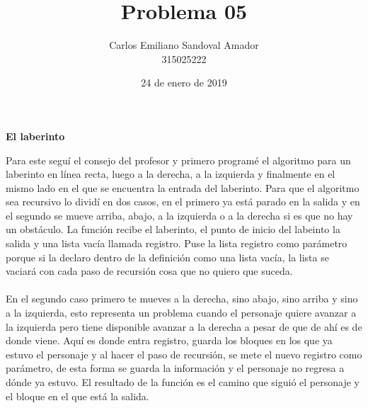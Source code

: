 \documentclass[letterpaper, 12pt, oneside]{article}%
\title{Problema 05}
\author{Carlos Emiliano Sandoval Amador \\ 315025222}
\date{24 de enero de 2019}
\begin{document}
	\maketitle
	\begin{center}
		\textbf{\large El laberinto}
	\end{center}
	Para este seguí el consejo del profesor y primero programé el algoritmo para un laberinto en línea recta, luego a la derecha, a la izquierda y finalmente en el mismo lado en el que se encuentra la entrada del laberinto. Para que el algoritmo sea recursivo lo dividí en dos casos, en el primero ya está parado en la salida y en el segundo se mueve arriba, abajo, a la izquierda o a la derecha si es que no hay un obstáculo. La función recibe el laberinto, el punto de inicio del labeinto la salida y una lista vacía llamada registro. Puse la lista registro como parámetro porque si la declaro dentro de la definición como una lista vacía, la lista se vaciará con cada paso de recursión cosa que no quiero que suceda. \\ \\ En el segundo caso primero te mueves a la derecha, sino abajo, sino arriba y sino a la izquierda, esto representa un problema cuando el personaje quiere avanzar a la izquierda pero tiene disponible avanzar a la derecha a pesar de que de ahí es de donde viene. Aquí es donde entra registro, guarda los bloques en los que ya estuvo el personaje y al hacer el paso de recursión, se mete el nuevo registro como parámetro, de esta forma se guarda la información y el personaje no regresa a dónde ya estuvo. El resultado de la función es el camino que siguió el personaje y el bloque en el que está la salida.
\end{document}
